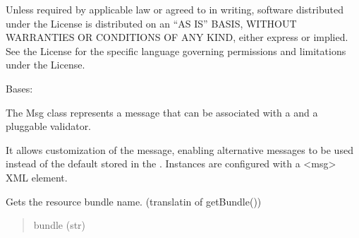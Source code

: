 \documentclass[letterpaper,10pt,english]{sphinxmanual}
\begin{document}
\sphinxAtStartPar
{}

\sphinxAtStartPar
Unless required by applicable law or agreed to in writing, software
distributed under the License is distributed on an “AS IS” BASIS,
WITHOUT WARRANTIES OR CONDITIONS OF ANY KIND, either express or implied.
See the License for the specific language governing permissions and
limitations under the License.

\begin{fulllineitems}
\label{\detokenize{apache_commons_validator_python:apache_commons_validator_python.msg_new.Msg}}
\pysigstartsignatures
{}
\pysigstopsignatures
\sphinxAtStartPar
Bases: 

\sphinxAtStartPar
The Msg class represents a message that can be associated with a  and a
pluggable validator.

\sphinxAtStartPar
It allows customization of the message,
enabling alternative messages to be used instead of the default stored
in the . Instances are configured with a \textless{}msg\textgreater{} XML element.

\begin{fulllineitems}
\label{\detokenize{apache_commons_validator_python:apache_commons_validator_python.msg_new.Msg.bundle}}
\pysigstartsignatures
{}
\pysigstopsignatures
\sphinxAtStartPar
Gets the resource bundle name.
(translatin of getBundle())
\begin{quote}\begin{description}
\sphinxAtStartPar
bundle (str)

\end{description}\end{quote}

\end{fulllineitems}


\end{fulllineitems}
\end{document}
